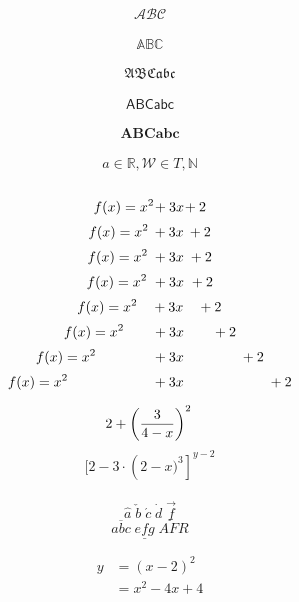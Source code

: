 \documentclass[12pt]{article}
\begin{document}
$$\mathcal{A B C}$$ \\
$$\mathbb{A B C}$$  \\
$$\mathfrak{A B C a b c}$$ \\
$$\mathsf{A B C a b c}$$ \\
$$\mathbf{A B C a b c}$$ \\
$$a\in \mathbb{R},
 \mathcal{W}\in T, \mathbb{N}$$\\
 $$f(x) = x^2\!+3x\!+2\!\\$$
 $$f(x) = x^2\:+3x\:+2\\$$
 $$f(x) = x^2\;+3x\;+2\\$$
 $$f(x) = x^2\ +3x\ +2\\$$
 $$f(x) = x^2\quad+3x\quad+2\\$$
 $$f(x) = x^2\qquad+3x\qquad+2\\$$
 $$f(x) = x^2\qquad\qquad+3x\qquad\qquad+2\\$$
 $$f(x) = x^2\qquad\qquad\qquad+3x\qquad\qquad\qquad+2\\$$

 $$
2+\left( \frac{3}{4-x} \right)^2\\$$
$$\lbrack 2-3 \cdot \left (2-x)^3 \right \rbrack ^{y-2}
$$\\
$$\hat{a}\;\check{b}\;\acute{c}\;\dot{d} \;\overrightarrow{f}$$
$$\overline{abc}\; \underline{efg}\; \widetilde{AFR} $$

\begin{equation}
\begin{split}
y & =\left(x-2\right)^2 \\
 & = x^2-4x+4
\end{split}
\end{equation}
\end{document}
